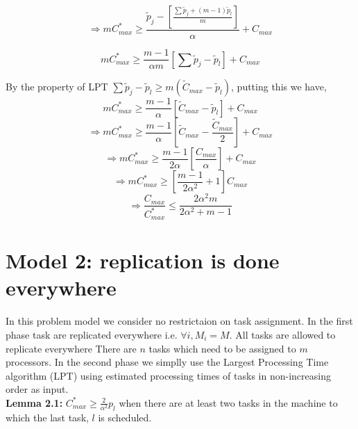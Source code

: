 \documentclass[10pt, conference, compsocconf]{IEEEtran}
\begin{document}
\begin{equation}\nonumber 
\Rightarrow m C_{max}^{*}\geq \frac{\tilde p_j-[\frac{\sum{\tilde p_j + (m-1) \tilde p_l }}{m}]} {\alpha} + {C_{max}}
\end{equation}

\begin{equation}\nonumber
 m C_{max}^{*}\geq \frac{m-1}{\alpha m} [\sum \tilde p_j-\tilde p_l] + {C_{max}}
 \end{equation}

By the property of LPT $\sum \tilde p_j-\tilde p_l \geq m (\tilde C_{max}-\tilde p_l)$, putting this we have,\\
\begin{equation}\nonumber 
 m C_{max}^{*}\geq \frac{m-1}{\alpha } [\tilde C_{max}-\tilde p_l] + {C_{max}}
 \end{equation}
\begin{equation}\nonumber
\Rightarrow m C_{max}^{*}\geq \frac{m-1}{\alpha } [\tilde C_{max}-\frac{\tilde C_{max}}{2}] + {C_{max}}
\end{equation}
\begin{equation}\nonumber
\Rightarrow m C_{max}^{*}\geq \frac{m-1}{2\alpha } [\frac{C_{max}} {\alpha} ]+ {C_{max}}
\end{equation}
\begin{equation}\nonumber
\Rightarrow m C_{max}^{*}\geq[\frac{m-1}{2\alpha^{2} } +1]{C_{max}}
\end{equation}
\begin{equation}\nonumber
\Rightarrow \frac{C_{max}}{C_{max}^{*}}\leq \frac{2\alpha^{2}m}{2\alpha^{2}+ m-1}
\end{equation}



\section{Model 2: replication is done everywhere}
In this problem model we consider no restrictaion on task assignment.  In the first phase task are replicated everywhere i.e. $\forall i, M_{i}=M $.  All tasks are allowed to replicate everywhere There are $ n$ tasks which need to be  assigned to $m$ processors. In the second phase we   simplly use the  Largest Processing Time algorithm (LPT) using estimated processing times of tasks in non-increasing order as input.  \\




\textbf{Lemma 2.1:} $C_{max}^{*} \geq {\frac{2}{\alpha^{2}}} p_l $  when there are at least two tasks in the machine to which the last task, $l$ is scheduled.
\end{document}

